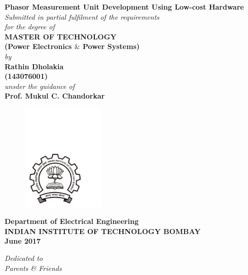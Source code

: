 \thispagestyle{empty}
\begin{center}
\huge
\textbf{Phasor Measurement Unit Development Using Low-cost Hardware}\\
\bigskip
\bigskip
\normalsize
\textit{Submitted in partial fulfilment of the requirements\\
                for  the degree of 
 }\\
\vspace*{0.8cm}
\textbf{MASTER OF TECHNOLOGY}\\
\textbf{(Power Electronics $ \& $ Power Systems)}\\
\vspace*{0.8cm}
\textit{by}\\
\vspace*{0.8cm}
\textbf{Rathin Dholakia \\(143076001)}\\
\vspace*{0.8cm}
\textit{unsder the guidance of}\\
\textbf{Prof. Mukul C. Chandorkar}\\
\vspace*{0.8cm}
\begin{figure}[h!]
 \centering
 \includegraphics[trim=1cm 1cm 5cm 12.5cm, clip=true, width=4cm]{chapter0_initial/logo}
\end{figure}
\bigskip
\bigskip
\large
\textbf{Department of Electrical Engineering}\\
\bigskip
\textbf{INDIAN INSTITUTE OF TECHNOLOGY BOMBAY}\\
\bigskip
\textbf{June 2017}
\end{center}

\normalsize
 



\newpage
\thispagestyle{empty}
\vspace*{200pt}
\begin{center}
 \large

 \textit{
Dedicated to\\
\bigskip
 Parents \& Friends}
\end{center}
\normalsize